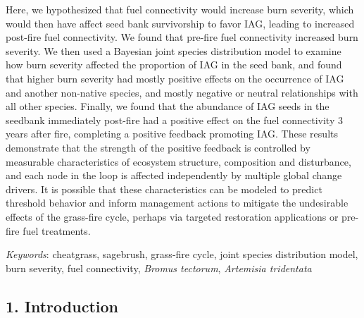 \documentclass[
  12pt,
]{article}
\begin{document}
Here, we hypothesized that fuel connectivity would increase burn
severity, which would then have affect seed bank survivorship to favor
IAG, leading to increased post-fire fuel connectivity. We found that
pre-fire fuel connectivity increased burn severity. We then used a
Bayesian joint species distribution model to examine how burn severity
affected the proportion of IAG in the seed bank, and found that higher
burn severity had mostly positive effects on the occurrence of IAG and
another non-native species, and mostly negative or neutral relationships
with all other species. Finally, we found that the abundance of IAG
seeds in the seedbank immediately post-fire had a positive effect on the
fuel connectivity 3 years after fire, completing a positive feedback
promoting IAG. These results demonstrate that the strength of the
positive feedback is controlled by measurable characteristics of
ecosystem structure, composition and disturbance, and each node in the
loop is affected independently by multiple global change drivers. It is
possible that these characteristics can be modeled to predict threshold
behavior and inform management actions to mitigate the undesirable
effects of the grass-fire cycle, perhaps via targeted restoration
applications or pre-fire fuel treatments.

\emph{Keywords}: cheatgrass, sagebrush, grass-fire cycle, joint species
distribution model, burn severity, fuel connectivity, \emph{Bromus
tectorum}, \emph{Artemisia tridentata}

\hypertarget{introduction}{%
\subsection{1. Introduction}\label{introduction}}
\end{document}
